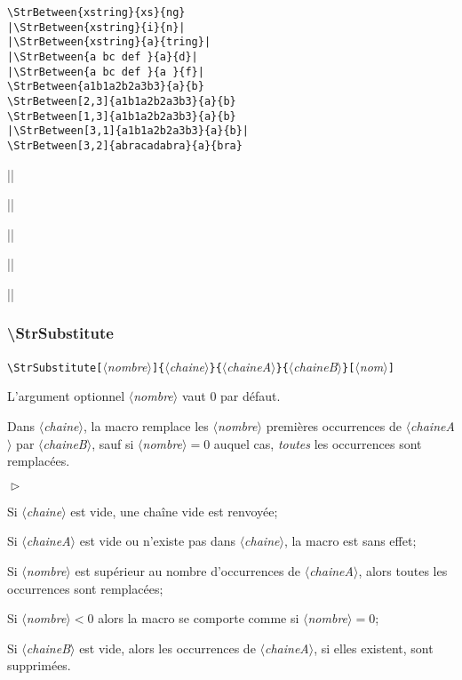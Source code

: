 \documentclass[a4paper,10pt]{article}
\newcommand\argu[1]{$\langle$\textit{#1}$\rangle$}
\newcommand\ARGU[1]{\texttt{\color{black}\{}\argu{#1}\texttt{\color{black}\}}}
\newcommand\arguC[1]{\texttt{\color{black}[}\argu{#1}\texttt{\color{black}]}}
\newenvironment{Conditions}[1][1cm]%
{\begin{list}%
	{$\vartriangleright$}%
	{\setlength{\leftmargin}{#1}
	 \setlength{\itemsep}{0pt}
	 \setlength{\parsep}{0pt}
	 \setlength{\topsep}{2ptplus3ptminus2pt}
	}}%
{\end{list}}
\newcommand\styleexemple{\small\vskip4pt}
\newcommand\verbinline{\lstinline[basicstyle=\normalsize\ttfamily]}
\begin{document}
\begin{minipage}[t]{0.65\linewidth}
\begin{lstlisting}
\StrBetween{xstring}{xs}{ng}
|\StrBetween{xstring}{i}{n}|
|\StrBetween{xstring}{a}{tring}|
|\StrBetween{a bc def }{a}{d}|
|\StrBetween{a bc def }{a }{f}|
\StrBetween{a1b1a2b2a3b3}{a}{b}
\StrBetween[2,3]{a1b1a2b2a3b3}{a}{b}
\StrBetween[1,3]{a1b1a2b2a3b3}{a}{b}
|\StrBetween[3,1]{a1b1a2b2a3b3}{a}{b}|
\StrBetween[3,2]{abracadabra}{a}{bra}
\end{lstlisting}%
\end{minipage}\hfill
\begin{minipage}[t]{0.35\linewidth}
	\styleexemple
	\par
	||\par
	||\par
	||\par
	||\par
	\par
	\par
	\par
	||\par
	\par
\end{minipage}%

\subsubsection{\ttfamily\textbackslash StrSubstitute}
\verbinline|\StrSubstitute|\arguC{nombre}\ARGU{chaine}\ARGU{chaineA}\ARGU{chaineB}\arguC{nom}
\smallskip

L'argument optionnel \argu{nombre} vaut 0 par défaut.\par\nobreak\smallskip
Dans \argu{chaine}, la macro remplace les \argu{nombre} premières occurrences de \argu{chaineA} par \argu{chaineB}, sauf si \argu{nombre}${}=0$ auquel cas, \emph{toutes} les occurrences sont remplacées.

\begin{Conditions}
	\item Si \argu{chaine} est vide, une chaîne vide est renvoyée;
	\item Si \argu{chaineA} est vide ou n'existe pas dans \argu{chaine}, la macro est sans effet;
	\item Si \argu{nombre} est supérieur au nombre d'occurrences de \argu{chaineA}, alors toutes les occurrences sont remplacées;
	\item Si \argu{nombre}${}<0$ alors la macro se comporte comme si \argu{nombre}${}=0$;
	\item Si \argu{chaineB} est vide, alors les occurrences de \argu{chaineA}, si elles existent, sont supprimées.
\end{Conditions}
\end{document}
